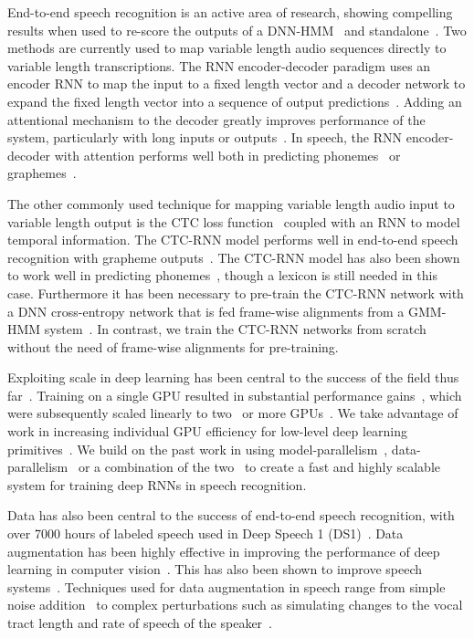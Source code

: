\documentclass{article}
\begin{document}
End-to-end speech recognition is an active area of research, showing compelling results when used to re-score the outputs of a DNN-HMM~\cite{graves2014} and standalone~\cite{hannun2014deepspeech}. Two methods are currently used to map variable length audio sequences directly to variable length transcriptions. The RNN encoder-decoder paradigm uses an encoder RNN to map the input to a fixed length vector and a decoder network to expand the fixed length vector into a sequence of output predictions~\cite{cho2014, sutskever2014seq}. Adding an attentional mechanism to the decoder greatly improves performance of the system, particularly with long inputs or outputs~\cite{bahdanau2015}. In speech, the RNN encoder-decoder with attention performs well both in predicting phonemes~\cite{chorowski2015firstresults} or graphemes~\cite{bahdanau2015b, chan2015}. 

The other commonly used technique for mapping variable length audio input to variable length output is the CTC loss function~\cite{graves2006} coupled with an RNN to model temporal information. The CTC-RNN model performs well in end-to-end speech recognition with grapheme outputs~\cite{graves2014, hannun2014firstpass, hannun2014deepspeech, maas2015}. The CTC-RNN model has also been shown to work well in predicting phonemes~\cite{miao2015, sak2015}, though a lexicon is still needed in this case.
Furthermore it has been necessary to pre-train the CTC-RNN network with a DNN cross-entropy network that is fed frame-wise alignments from a GMM-HMM system~\cite{sak2015}. In contrast, we train the CTC-RNN networks from scratch without the need of frame-wise alignments for pre-training.

Exploiting scale in deep learning has been central to the success of the field thus far~\cite{krizhevsky2012imagenet, le2012faces}. Training on a single GPU resulted in substantial performance gains~\cite{raina2009large}, which were subsequently scaled linearly to two~\cite{krizhevsky2012imagenet} or more GPUs~\cite{coates2013cotshpc}. We take advantage of work in increasing individual GPU efficiency for low-level deep learning primitives~\cite{chetlur14}. We build on the past work in using model-parallelism~\cite{coates2013cotshpc}, data-parallelism~\cite{dean2012largescale} or a combination of the two~\cite{szegedy2014googlenet, hannun2014deepspeech} to create a fast and highly scalable system for training deep RNNs in speech recognition.

Data has also been central to the success of end-to-end speech recognition, with over 7000 hours of labeled speech used in Deep Speech 1 (DS1)~\cite{hannun2014deepspeech}. Data augmentation has been highly effective in improving the performance of deep learning in computer vision~\cite{lecun2004learningmethods, sapp2008synth, coates2011icdar}. This has also been shown to improve speech systems~\cite{gales2009, hannun2014deepspeech}. Techniques used for data augmentation in speech range from simple noise addition~\cite{hannun2014deepspeech} to complex perturbations such as simulating changes to the vocal tract length and rate of speech of the speaker~\cite{jaitly2013, ko2015}. 
\end{document}
